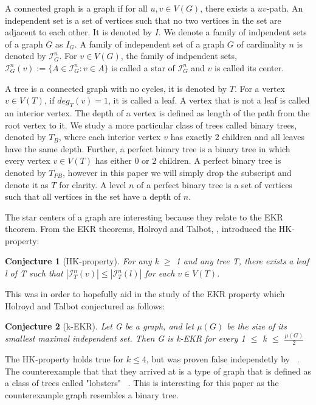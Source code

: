 \documentclass{amsart}
\newtheorem{conj}{Conjecture}[section]
\theoremstyle{definition}
\begin{document}
A connected graph is a graph if for all $u,v \in V(G)$, there exists a $uv$-path. An independent set is a set of vertices such that no two vertices in the set are adjacent to each other. It is denoted by $I$. We denote a family of indpendent sets of a graph $G$ as $I_G$. A family of independent set of a graph $G$ of cardinality $n$ is denoted by $\mathcal{I}^n_G$. For $v \in V(G)$, the family of indpendent sets, $\mathcal{I}^n_G(v) := \{A \in \mathcal{I}^n_G : v \in A\}$ is called a star of $\mathcal{I}^n_G$ and $v$ is called its center.

A tree is a connected graph with no cycles, it is denoted by $T$. For a vertex $v \in V(T)$, if $deg_T(v) = 1$, it is called a leaf. A vertex that is not a leaf is called an interior vertex. The depth of a vertex is defined as length of the path from the root vertex to it. We study a more particular class of trees called binary trees, denoted by $T_B$, where each interior vertex $v$ has exactly $2$ children and all leaves have the same depth. Further, a perfect binary tree is a binary tree in which every vertex $v \in V(T)$ has either $0$ or $2$ children. A perfect binary tree is denoted by $T_{PB}$, however in this paper we will simply drop the subscript and denote it as $T$ for clarity. A level $n$ of a perfect binary tree is a set of vertices such that all vertices in the set have a depth of $n$.

The star centers of a graph are interesting because they relate to the EKR theorem. From the EKR theorems, Holroyd and Talbot, \cite{MR2763040}, introduced the HK-property:

\begin{conj}[HK-property]
  For any k $\geq$ 1 and any tree T, there exists a leaf l of T such that $\left|\mathcal{I}^n_T(v)\right| \leq \left|\mathcal{I}^n_T(l)\right|$ for each $v \in V(T)$.
\end{conj}

This was in order to hopefully aid in the study of the EKR property which Holroyd and Talbot \cite{MR2136060} conjectured as follows:

\begin{conj}[k-EKR]
  Let G be a graph, and let $\mu(G)$ be the size of its smallest maximal independent set. Then G is k-EKR for every 1 $\leq$ k $\leq$ $\frac{\mu(G)}{2}$
\end{conj}

The HK-property holds true for $k \leq 4$, but was proven false independetly by ~\cite{MR3271819, MR3612439, MR2523796}. The counterexample that that they arrived at is a type of graph that is defined as a class of trees called "lobsters" ~\cite{MR4245360}. This is interesting for this paper as the counterexample graph resembles a binary tree.
\end{document}
